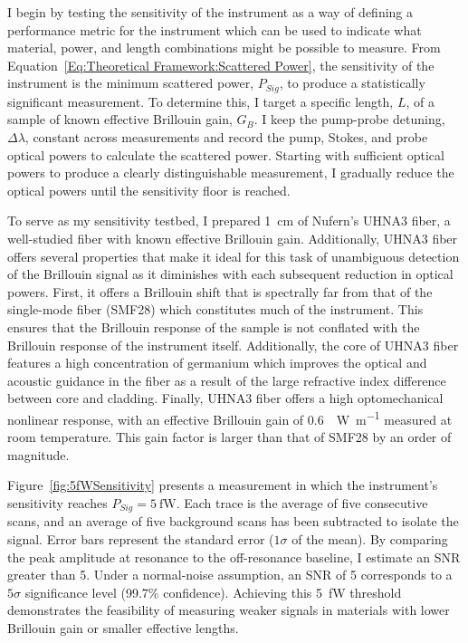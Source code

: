 \FloatBarrier

I begin by testing the sensitivity of the instrument as a way of defining a performance metric for the instrument which can be used to indicate what material, power, and length combinations might be possible to measure. From Equation~\ref{Eq:Theoretical Framework:Scattered Power}, the sensitivity of the instrument is the minimum scattered power, \(P_{Sig}\), to produce a statistically significant measurement. To determine this, I target a specific length, \(L\), of a sample of known effective Brillouin gain, \(G_B\). I keep the pump-probe detuning, \(\Delta\lambda\), constant across measurements and record the pump, Stokes, and probe optical powers to calculate the scattered power. Starting with sufficient optical powers to produce a clearly distinguishable measurement, I gradually reduce the optical powers until the sensitivity floor is reached.

To serve as my sensitivity testbed, I prepared \SI{1}{\centi\meter} of Nufern's UHNA3 fiber, a well-studied fiber with known effective Brillouin gain\cite{behunin2015long}. Additionally, UHNA3 fiber offers several properties that make it ideal for this task of unambiguous detection of the Brillouin signal as it diminishes with each subsequent reduction in optical powers. First, it offers a Brillouin shift that is spectrally far from that of the single-mode fiber (SMF28) which constitutes much of the instrument. This ensures that the Brillouin response of the sample is not conflated with the Brillouin response of the instrument itself. Additionally, the core of UHNA3 fiber features a high concentration of germanium which improves the optical and acoustic guidance in the fiber as a result of the large refractive index difference between core and cladding. Finally, UHNA3 fiber offers a high optomechanical nonlinear response, with an effective Brillouin gain of \SI{0.6}{\per\watt\per\meter} measured at room temperature\cite{behunin2015long}. This gain factor is larger than that of SMF28 by an order of magnitude\cite{nikles1997brillouin}.

Figure~\ref{fig:5fWSensitivity} presents a measurement in which the instrument’s sensitivity reaches \(P_{Sig}\!= \SI{5}{\femto\watt}\). Each trace is the average of five consecutive scans, and an average of five background scans has been subtracted to isolate the signal. Error bars represent the standard error (\(1\sigma\) of the mean). By comparing the peak amplitude at resonance to the off-resonance baseline, I estimate an SNR greater than 5. Under a normal-noise assumption, an SNR of 5 corresponds to a \(5\sigma\) significance level (99.7\% confidence). Achieving this \SI{5}{\femto\watt} threshold demonstrates the feasibility of measuring weaker signals in materials with lower Brillouin gain or smaller effective lengths.

